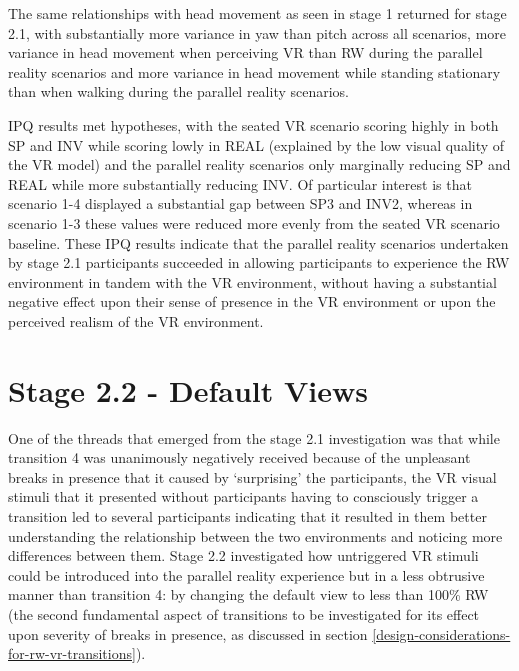 The same relationships with head movement as seen in stage 1 returned for stage 2.1, with substantially more variance in yaw than pitch across all scenarios, more variance in head movement when perceiving VR than RW during the parallel reality scenarios and more variance in head movement while standing stationary than when walking during the parallel reality scenarios.

IPQ results met hypotheses, with the seated VR scenario scoring highly in both SP and INV while scoring lowly in REAL (explained by the low visual quality of the VR model) and the parallel reality scenarios only marginally reducing SP and REAL while more substantially reducing INV. Of particular interest is that scenario 1-4 displayed a substantial gap between SP3 and INV2, whereas in scenario 1-3 these values were reduced more evenly from the seated VR scenario baseline. These IPQ results indicate that the parallel reality scenarios undertaken by stage 2.1 participants succeeded in allowing participants to experience the RW environment in tandem with the VR environment, without having a substantial negative effect upon their sense of presence in the VR environment or upon the perceived realism of the VR environment.




\section{Stage 2.2 - Default Views}

One of the threads that emerged from the stage 2.1 investigation was that while transition 4 was unanimously negatively received because of the unpleasant breaks in presence that it caused by `surprising' the participants, the VR visual stimuli that it presented without participants having to consciously trigger a transition led to several participants indicating that it resulted in them better understanding the relationship between the two environments and noticing more differences between them. Stage 2.2 investigated how untriggered VR stimuli could be introduced into the parallel reality experience but in a less obtrusive manner than transition 4: by changing the default view to less than 100\% RW (the second fundamental aspect of transitions to be investigated for its effect upon severity of breaks in presence, as discussed in section \ref{design-considerations-for-rw-vr-transitions}).

